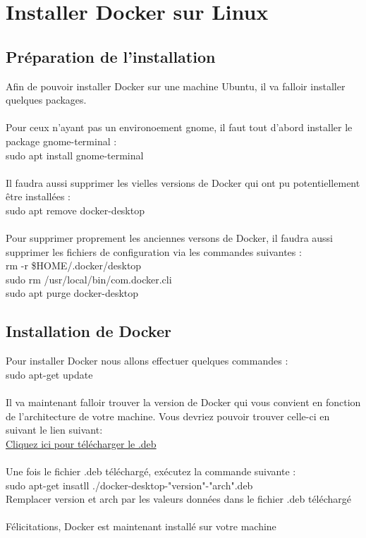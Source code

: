 \documentclass{article}
\begin{document}
    \section{Installer Docker sur Linux}
    \subsection{Préparation de l'installation}

    Afin de pouvoir installer Docker sur une machine Ubuntu, il va falloir installer quelques packages.
    \\
    \\
    Pour ceux n'ayant pas un environoement gnome, il faut tout d'abord installer le package gnome-terminal :
    \\
    \indent sudo apt install gnome-terminal 
    \\
    \\
    Il faudra aussi supprimer les vielles versions de Docker qui ont pu potentiellement être installées :
    \\
    \indent sudo apt remove docker-desktop
    \\
    \\
    Pour supprimer proprement les anciennes versons de Docker, il faudra aussi supprimer les fichiers de configuration via les commandes suivantes :
    \\
    \indent rm -r \$HOME/.docker/desktop \\
    \indent sudo rm /usr/local/bin/com.docker.cli \\
    \indent sudo apt purge docker-desktop \\

    \subsection{Installation de Docker}

    Pour installer Docker nous allons effectuer quelques commandes :
    \\
    \indent sudo apt-get update
    \\
    \\
    Il va maintenant falloir trouver la version de Docker qui vous convient en fonction de l'architecture de votre machine.
    Vous devriez pouvoir trouver celle-ci en suivant le lien suivant:
    \\
    \indent\href{https://desktop.docker.com/linux/main/amd64/docker-desktop-4.26.0-amd64.deb?utm_source=docker&utm_medium=webreferral&utm_campaign=docs-driven-download-linux-amd64}{Cliquez ici pour télécharger le .deb}
    \\
    \\
    Une fois le fichier .deb téléchargé, exécutez la commande suivante :
    \\
    \indent sudo apt-get insatll ./docker-desktop-"version"-"arch".deb
    \\
    Remplacer version et arch par les valeurs données dans le fichier .deb téléchargé
    \\
    \\
    Félicitations, Docker est maintenant installé sur votre machine
\end{document}
